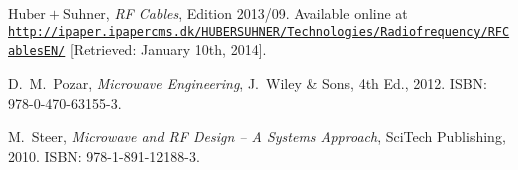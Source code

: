 \documentclass[a4paper, 12pt]{article}
\begin{document}
\begin{thebibliography}{9}%

 $\mathrm{Huber}+\mathrm{Suhner}$, 
	\textit{RF Cables}, 
	Edition 2013/09. 
	Available online at \href{http://ipaper.ipapercms.dk/HUBERSUHNER/Technologies/Radiofrequency/RFCablesEN/}
		{\texttt{http://ipaper.\linebreak{}ipapercms.dk/HUBERSUHNER/Technologies/Radiofrequency/RFCablesEN/}}
	[Retrieved: January 10th, 2014].


 D.\ M.\ Pozar, 
	\textit{Microwave Engineering}, 
	J.\ Wiley \& Sons, 4th Ed., 2012. 
	ISBN: 978-0-470-63155-3.
	

 M.\ Steer, 
	\textit{Microwave and RF Design -- A Systems Approach}, 
	SciTech Publishing, 2010. 
	ISBN: 978-1-891-12188-3.
	
	

\end{thebibliography}
\end{document}
